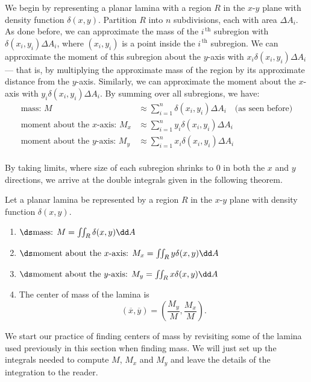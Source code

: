 We begin by representing a planar lamina with a region $R$ in the $x$-$y$ plane with density function $\delta(x,y)$. Partition $R$ into $n$ subdivisions, each with area $\Delta A_i$. As done before, we can approximate the mass of the $i^{\,\text{th}}$ subregion with $\delta(x_i,y_i)\Delta A_i$, where $(x_i,y_i)$ is a point inside the $i^{\,\text{th}}$ subregion. We can approximate the moment of this subregion about the $y$-axis with $x_i\delta(x_i,y_i)\Delta A_i$ --- that is, by multiplying the approximate mass of the region by its approximate distance from the $y$-axis. Similarly, we can approximate the moment about the $x$-axis with $y_i\delta(x_i,y_i)\Delta A_i$. By summing over all subregions, we have:
\begin{align*}
\text{mass: } M &\approx \sum_{i=1}^n \delta(x_i,y_i)\Delta A_i\quad \text{(as seen before)}\\
\text{moment about the $x$-axis: } M_x &\approx \sum_{i=1}^n y_i\delta(x_i,y_i)\Delta A_i\\
\text{moment about the $y$-axis: } M_y &\approx \sum_{i=1}^n x_i\delta(x_i,y_i)\Delta A_i\\
\end{align*}

By taking limits, where size of each subregion shrinks to 0 in both the $x$ and $y$ directions, we arrive at the double integrals given in the following theorem.

\begin{theorem}\label{thm:center_of_mass}%
Let a planar lamina be represented by a region $R$ in the $x$-$y$ plane with density function $\delta(x,y)$. 
\begin{enumerate}
	\item $\ds \text{mass: } M = \iint_R\delta(x,y)\dd A$
	\item	$\ds \text{moment about the $x$-axis: } M_x = \iint_Ry\delta(x,y)\dd A$
	\item	$\ds \text{moment about the $y$-axis: } M_y = \iint_Rx\delta(x,y)\dd A$
	\item The center of mass  of the lamina is
	\[(\overline{x},\overline{y}) = \left(\frac{M_y}{M},\frac{M_x}M\right).\]
\end{enumerate}
\end{theorem}

We start our practice of finding centers of mass by revisiting some of the lamina used previously in this section when finding mass. We will  just set up the integrals needed to compute $M$, $M_x$ and $M_y$ and leave the details of the integration to the reader.

